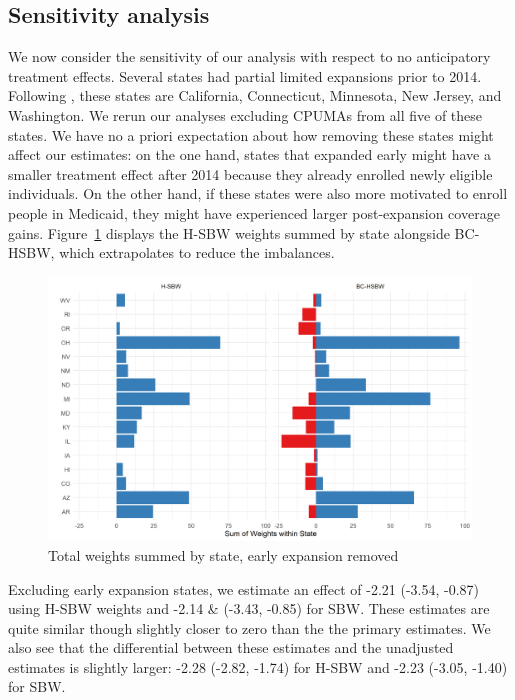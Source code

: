 \subsection{Sensitivity analysis} \label{sssec:sensitivity}

We now consider the sensitivity of our analysis with respect to no anticipatory treatment effects. Several states had partial limited expansions prior to 2014. Following \cite{frean2017premium}, these states are California, Connecticut, Minnesota, New Jersey, and Washington. We rerun our analyses excluding CPUMAs from all five of these states. We have no a priori expectation about how removing these states might affect our estimates: on the one hand, states that expanded early might have a smaller treatment effect after 2014 because they already enrolled newly eligible individuals. On the other hand, if these states were also more motivated to enroll people in Medicaid, they might have experienced larger post-expansion coverage gains. Figure~\ref{fig:weightsbystatec2} displays the H-SBW weights summed by state alongside BC-HSBW, which extrapolates to reduce the imbalances. 

\begin{figure}[H]
\begin{center}
    \caption{Total weights summed by state, early expansion removed}
    \label{fig:weightsbystatec2}
    \includegraphics[scale=0.6]{01_Plots/weights-by-state-hsbw-c2.png}
\end{center}
\end{figure}

Excluding early expansion states, we estimate an effect of -2.21 (-3.54, -0.87) using H-SBW weights and -2.14 & (-3.43, -0.85) for SBW. These estimates are quite similar though slightly closer to zero than the the primary estimates. We also see that the differential between these estimates and the unadjusted estimates is slightly larger: -2.28  (-2.82, -1.74) for H-SBW and -2.23  (-3.05, -1.40) for SBW. 

